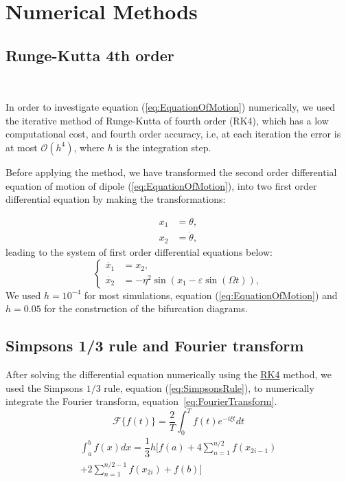 \section{Numerical Methods}
\subsection{Runge-Kutta 4th order}~\label{sec:RK4}

In order to investigate equation (\ref{eq:EquationOfMotion}) numerically, we used the iterative method of Runge-Kutta of fourth order (RK4), which has a low computational cost, and fourth order accuracy, i.e, at each iteration the error is at most $\mathcal{O}(h^4)$, where $h$ is the integration step.

Before applying the method, we have transformed the second order differential equation of motion of dipole (\ref{eq:EquationOfMotion}), into two first order differential equation by making the transformations:

\begin{equation}
    \begin{aligned}
        x_1 &= \theta,\\
        x_2 &= \dot{\theta}, 
    \end{aligned}
\end{equation}
leading to the system of first order differential equations below:
\begin{equation}
    \begin{cases}
        \dot{x_1} &= x_2,\\
        \dot{x_2} &= -\eta^2 \sin(x_1 - \varepsilon \sin(\Omega t)),
    \end{cases}
\end{equation}
We used $h=10^{-4}$ for most simulations, equation (\ref{eq:EquationOfMotion}) and $h = 0.05$ for the construction of the bifurcation diagrams.

\subsection{Simpson\textquotesingle s 1/3 rule and Fourier transform}
After solving the differential equation numerically using the \hyperref[sec:RK4]{RK4} method, we used the Simpson\textquotesingle s $1/3$ rule, equation (\ref{eq:SimpsonsRule}), to numerically integrate the Fourier transform, equation~\ref{eq:FourierTransform}.
\begin{equation}
    \mathcal{F}\{f(t)\}= \dfrac{2}{T}\int_{0}^{T} f(t) e^{- i \xi t}dt
    \label{eq:FourierTransform}
\end{equation}
    \begin{multline}
        \int_{a}^{b} f(x) dx = \dfrac{1}{3} h\bigg[ f(a) + 
         4\sum^{n/2}_{n=1}f(x_{2i-1}) \\
         + 2 \sum^{n/2 - 1}_{n=1}f(x_{2i})+f(b) \bigg]        
    \label{eq:SimpsonsRule}
\end{multline}
